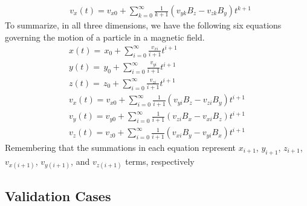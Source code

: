 \documentclass[9pt]{article}
\begin{document}
\begin{multicols}{2}
\begin{equation}
\begin{split}
            &\boxed{v_x(t)=v_{x0}+\sum_{k=0}^\infty\frac{1}{k+1} (v_{yk}B_z-v_{zk}B_y)t^{k+1}}
        \end{split}
    \end{equation}
To summarize, in all three dimensions, we have the following six equations governing the motion of a particle in a magnetic field.
    \begin{align}
        x(t)=\,x_0 + \sum_{i=0}^\infty\frac{v_{xi}}{i+1} t^{i+1}\\
        y(t)=\,y_0 + \sum_{i=0}^\infty\frac{v_{yi}}{i+1} t^{i+1}\\
        z(t)=\,z_0 + \sum_{i=0}^\infty\frac{v_{zi}}{i+1} t^{i+1}\\
        v_x(t)=v_{x0}+\sum_{i=0}^\infty\frac{1}{i+1} (v_{yi}B_z-v_{zi}B_y)t^{i+1}\\
        v_y(t)=v_{y0}+\sum_{i=0}^\infty\frac{1}{i+1} (v_{zi}B_x-v_{xi}B_z)t^{i+1}\\
        v_z(t)=v_{z0}+\sum_{i=0}^\infty\frac{1}{i+1} (v_{xi}B_y-v_{yi}B_x)t^{i+1}
    \end{align}
Remembering that the summations in each equation represent $x_{i+1}$, $y_{i+1}$, $z_{i+1}$, $v_{x(i+1)}$, $v_{y(i+1)}$, and $v_{z(i+1)}$ terms, respectively

\subsection{Validation Cases}

\end{multicols}
\end{document}
